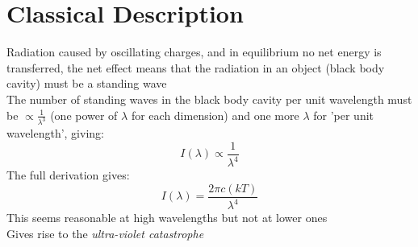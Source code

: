 \documentclass[a4paper, 11pt, fleqn, normalem]{report}
\begin{document}
\section{Classical Description}
Radiation caused by oscillating charges, and in equilibrium no net energy is transferred, the net effect means that the radiation in an object (black body cavity) must be a standing wave \\
The number of standing waves in the black body cavity per unit wavelength must be $\propto \frac{1}{\lambda^{3}}$ (one power of $\lambda$ for each dimension) and one more $\lambda$ for 'per unit wavelength', giving:
\begin{equation*}
    I(\lambda) \propto \frac{1}{\lambda^{4}}
\end{equation*}
The full derivation gives:
\begin{equation*}
    I(\lambda) = \frac{2\pi c(kT)}{\lambda^{4}}
\end{equation*}
This seems reasonable at high wavelengths but not at lower ones \\
Gives rise to the \emph{ultra-violet catastrophe}
\end{document}
